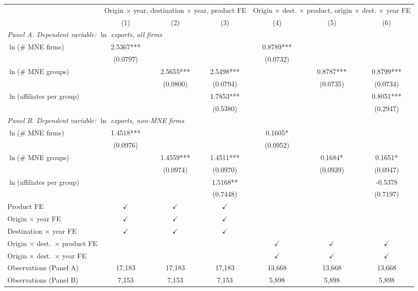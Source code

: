 \begin{tabular}{lcccccc} \hline
 & \multicolumn{3}{c}{Origin $\times$ year, destination $\times$ year, product FE} & \multicolumn{3}{c}{Origin $\times$ dest. $\times$ product, origin $\times$ dest. $\times$ year FE} \\
 & (1) & (2) & (3) & (4) & (5) & (6) \\ \hline
\multicolumn{7}{l}{\textit{Panel A. Dependent variable: $\ln$ exports, all firms}} \\
$\ln$(\# MNE firms) & 2.5367*** &  &  & 0.8789*** &  &  \\
 & (0.0797) &  &  & (0.0732) &  &  \\
$\ln$(\# MNE groups) &  & 2.5655*** & 2.5498*** &  & 0.8787*** & 0.8799*** \\
 &  & (0.0800) & (0.0794) &  & (0.0735) & (0.0734) \\
$\ln$(affiliates per group) &  &  & 1.7853*** &  &  & 0.8051*** \\
 &  &  & (0.5380) &  &  & (0.2947) \\
\midrule
\multicolumn{7}{l}{\textit{Panel B. Dependent variable: $\ln$ exports, non-MNE firms}} \\
$\ln$(\# MNE firms) & 1.4518*** &  &  & 0.1605* &  &  \\
 & (0.0976) &  &  & (0.0952) &  &  \\
$\ln$(\# MNE groups) &  & 1.4559*** & 1.4511*** &  & 0.1684* & 0.1651* \\
 &  & (0.0974) & (0.0970) &  & (0.0939) & (0.0947) \\
$\ln$(affiliates per group) &  &  & 1.5168** &  &  & -0.5378 \\
 &  &  & (0.7448) &  &  & (0.7197) \\
\hline
Product FE & $\checkmark$ & $\checkmark$ & $\checkmark$ &  &  &  \\
Origin $\times$ year FE & $\checkmark$ & $\checkmark$ & $\checkmark$ &  &  &  \\
Destination $\times$ year FE & $\checkmark$ & $\checkmark$ & $\checkmark$ &  &  &  \\
Origin $\times$ dest.\ $\times$ product FE &  &  &  & $\checkmark$ & $\checkmark$ & $\checkmark$ \\
Origin $\times$ dest.\ $\times$ year FE &  &  &  & $\checkmark$ & $\checkmark$ & $\checkmark$ \\
Observations (Panel A) & 17,183 & 17,183 & 17,183 & 13,668 & 13,668 & 13,668 \\
Observations (Panel B) & 7,153 & 7,153 & 7,153 & 5,898 & 5,898 & 5,898 \\
\hline
\end{tabular}
